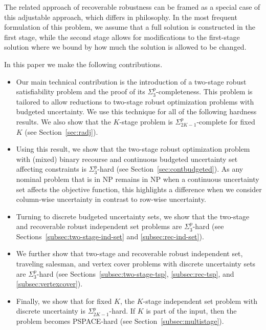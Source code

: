 The related approach of recoverable robustness \cite{liebchen2009concept} can be framed as a special case of this adjustable approach, which differs in philosophy. In the most frequent formulation of this problem, we assume that a full solution is constructed in the first stage, while the second stage allows for modifications to the first-stage solution where we bound by how much the solution is allowed to be changed.

In this paper we make the following contributions.
\begin{itemize}
\item Our main technical contribution is the introduction of a two-stage robust satisfiability problem 
and the proof of its $\Sigma^p_3$-completeness. 
This problem is tailored to allow reductions to two-stage robust optimization problems with budgeted uncertainty.
We use this technique for all of the following hardness results.
We also show that the $K$-stage problem is $\Sigma_{2K-1}^p$-complete for fixed $K$ (see Section~\ref{sec:radj}).

\item Using this result, we show that the two-stage robust optimization problem with (mixed) binary recourse and continuous budgeted uncertainty set affecting constraints is $\Sigma_3^p$-hard (see Section~\ref{sec:contbudgeted}). As any nominal problem that is in NP remains in NP when a continuous uncertainty set affects the objective function, this highlights a difference when we consider column-wise uncertainty in contrast to row-wise uncertainty.

\item Turning to discrete budgeted uncertainty sets, we show that the two-stage and recoverable robust independent set problems are $\Sigma_3^p$-hard (see Sections~\ref{subsec:two-stage-ind-set} and \ref{subsec:rec-ind-set}).

\item We further show that two-stage and recoverable robust independent set, traveling salesman, and vertex cover problems with discrete uncertainty sets are $\Sigma_3^p$-hard (see Sections~\ref{subsec:two-stage-tsp}, \ref{subsec:rec-tsp}, and \ref{subsec:vertexcover}).

\item Finally, we show that for fixed $K$, the $K$-stage independent set problem with discrete uncertainty is $\Sigma_{2K-1}^p$-hard. If $K$ is part of the input, then the problem becomes PSPACE-hard (see Section~\ref{subsec:multistage}).
\end{itemize}

